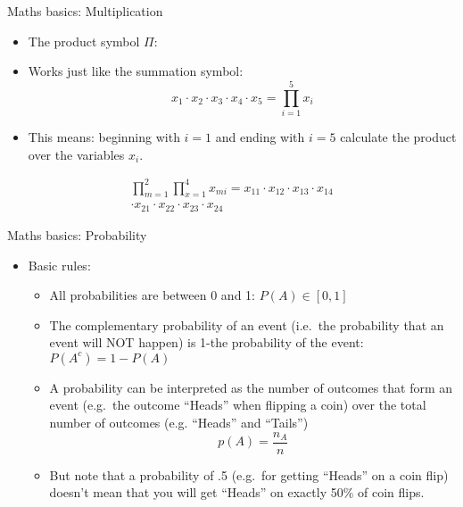 \begin{frame}{Maths basics: Multiplication}

\begin{itemize}
\itemsep1pt\parskip0pt
\item
  The product symbol \(\Pi\):
\item
  Works just like the summation symbol:
  \[x_1 \cdot x_2 \cdot x_3 \cdot x_4 \cdot x_5 = \prod\limits_{i=1}^5{x_i}\]
\item
  This means: beginning with \(i=1\) and ending with \(i=5\) calculate
  the product over the variables \(x_i\).
\end{itemize}

\[
\begin{aligned}
\prod\limits_{m=1}^{2}\prod\limits_{x=1}^{4}{x_{mi}} = x_{11}\cdot x_{12}\cdot x_{13}\cdot x_{14} \\
  \cdot x_{21} \cdot x_{22} \cdot x_{23} \cdot x_{24}
\end{aligned}
\]

\end{frame}

\begin{frame}{Maths basics: Probability}

\begin{itemize}
\itemsep1pt\parskip0pt
\item
  Basic rules:

  \begin{itemize}
  \itemsep1pt\parskip0pt
  \item
    All probabilities are between 0 and 1: \(P(A)\in[0,1]\)
  \item
    The complementary probability of an event (i.e.~the probability that
    an event will NOT happen) is 1-the probability of the event:
    \(P(A^c)=1-P(A)\)
  \item
    A probability can be interpreted as the number of outcomes that form
    an event (e.g.~the outcome ``Heads'' when flipping a coin) over the
    total number of outcomes (e.g. ``Heads'' and ``Tails'')
    \[ p(A) = \frac{n_A}{n}\]
  \item
    But note that a probability of .5 (e.g.~for getting ``Heads'' on a
    coin flip) doesn't mean that you will get ``Heads'' on exactly 50\%
    of coin flips.
  \end{itemize}
\end{itemize}

\end{frame}

